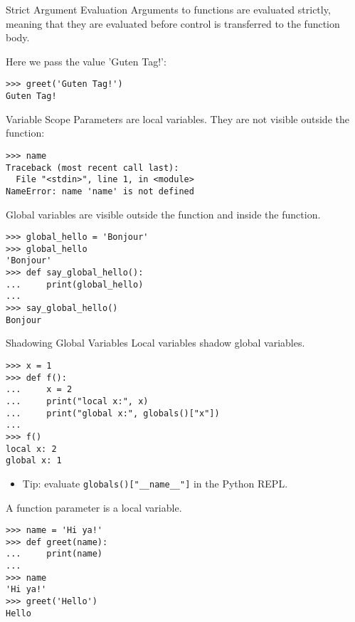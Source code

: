 \documentclass[smaller, aspectratio=1610]{beamer}
\begin{document}
\begin{frame}[label={sec:orgab0c48c},fragile]{Strict Argument Evaluation}
 Arguments to functions are evaluated strictly, meaning that they are evaluated before control is transferred to the function body.

Here we pass the value 'Guten Tag!':

\lstset{language=Python,label= ,caption= ,captionpos=b,numbers=none}
\begin{lstlisting}
>>> greet('Guten Tag!')
Guten Tag!
\end{lstlisting}
\end{frame}

\begin{frame}[label={sec:org57f5c3e},fragile]{Variable Scope}
 Parameters are local variables. They are not visible outside the function:

\lstset{language=Python,label= ,caption= ,captionpos=b,numbers=none}
\begin{lstlisting}
>>> name
Traceback (most recent call last):
  File "<stdin>", line 1, in <module>
NameError: name 'name' is not defined
\end{lstlisting}

Global variables are visible outside the function and inside the function.

\lstset{language=Python,label= ,caption= ,captionpos=b,numbers=none}
\begin{lstlisting}
>>> global_hello = 'Bonjour'
>>> global_hello
'Bonjour'
>>> def say_global_hello():
...     print(global_hello)
...
>>> say_global_hello()
Bonjour
\end{lstlisting}
\end{frame}

\begin{frame}[label={sec:org163e2ff},fragile]{Shadowing Global Variables}
 Local variables shadow global variables.

\lstset{language=Python,label= ,caption= ,captionpos=b,numbers=none}
\begin{lstlisting}
>>> x = 1
>>> def f():
...     x = 2
...     print("local x:", x)
...     print("global x:", globals()["x"])
...
>>> f()
local x: 2
global x: 1
\end{lstlisting}

\begin{itemize}
\item Tip: evaluate \texttt{globals()["\_\_name\_\_"]} in the Python REPL.
\end{itemize}

A function parameter is a local variable.

\lstset{language=Python,label= ,caption= ,captionpos=b,numbers=none}
\begin{lstlisting}
>>> name = 'Hi ya!'
>>> def greet(name):
...     print(name)
...
>>> name
'Hi ya!'
>>> greet('Hello')
Hello
\end{lstlisting}
\end{frame}
\end{document}
